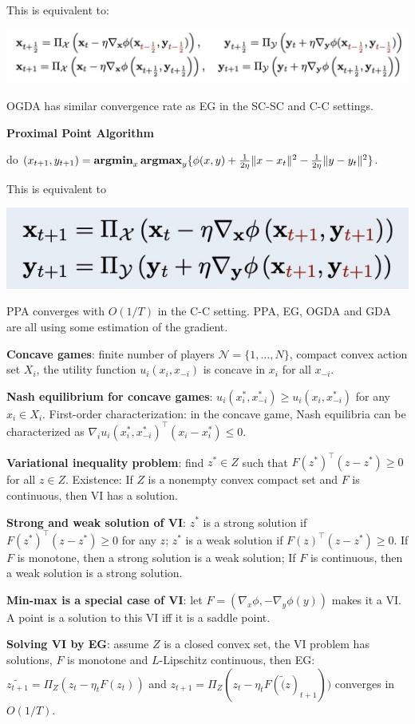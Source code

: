 This is equivalent to:

\includegraphics[width=\linewidth]{imgs/OGDA2.jpg}

OGDA has similar convergence rate as EG in the SC-SC and C-C settings.

\textbf{Proximal Point Algorithm}

do $(x_{t+1}, y_{t+1}) = \operatorname{\textbf{argmin}}_x \operatorname{\textbf{argmax}}_y \{\phi(x,y) + \frac{1}{2\eta} \|x-x_t\|^2 - \frac{1}{2\eta} \|y - y_t\|^2\}$.

This is equivalent to

\includegraphics[width=\linewidth]{imgs/PPA.jpg}

PPA converges with $O(1/T)$ in the C-C setting. PPA, EG, OGDA and GDA are all using some estimation of the gradient.

\textbf{Concave games}: finite number of players $\mathcal{N} = \{1,\dots,N\}$, compact convex action set $X_i$, the utility function $u_i(x_i, x_{-i})$ is concave in $x_i$ for all $x_{-i}$.

\textbf{Nash equilibrium for concave games}: $u_i(x^*_i, x^*_{-i}) \ge u_i(x_i, x^*_{-i})$ for any $x_i \in X_i$. First-order characterization: in the concave game, Nash equilibria can be characterized as $\nabla_i u_i(x^*_i, x^*_{-i})^\top (x_i-x^*_i) \le 0$.

\textbf{Variational inequality problem}: find $z^* \in Z$ such that $F(z^*)^\top (z-z^*) \ge 0$ for all $z \in Z$. Existence: If $Z$ is a nonempty convex compact set and $F$ is continuous, then VI has a solution.

\textbf{Strong and weak solution of VI}: $z^*$ is a strong solution if $F(z^*)^\top (z-z^*) \ge 0$ for any $z$; $z^*$ is a weak solution if $F(z)^\top (z-z^*) \ge 0$. If $F$ is monotone, then a strong solution is a weak solution; If $F$ is continuous, then a weak solution is a strong solution.

\textbf{Min-max is a special case of VI}: let $F = (\nabla_x \phi, -\nabla_y \phi(y))$ makes it a VI. A point is a solution to this VI iff it is a saddle point.

\textbf{Solving VI by EG}: assume $Z$ is a closed convex set, the VI problem has solutions, $F$ is monotone and $L$-Lipschitz continuous, then EG: $\tilde{z_{t+1}} = \Pi_Z(z_t - \eta_t F(z_t))$ and $z_{t+1} = \Pi_Z(z_t - \eta_t F(\tilde(z)_{t+1}))$ converges in $O(1/T)$.